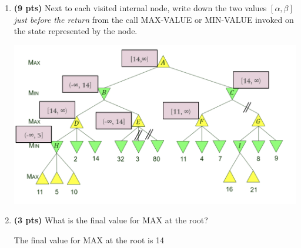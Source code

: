 \documentclass{article}
\begin{document}
\begin{enumerate}
\begin{enumerate}[label=($\alph*$)]

    
    \item \textbf{(9 pts)} Next to each visited internal node, write down the two values $[\alpha, \beta]$ \textit{just before the return} from the call MAX-VALUE or MIN-VALUE invoked on the state represented by the node.

    \includegraphics[scale=0.5]{472-PS4-Q3-B.png}


    
    \item \textbf{(3 pts)} What is the final value for MAX at the root?

    \color{blue}
        The final value for MAX at the root is 14
    \color{black}


    \end{enumerate}


\end{enumerate}
\end{document}
